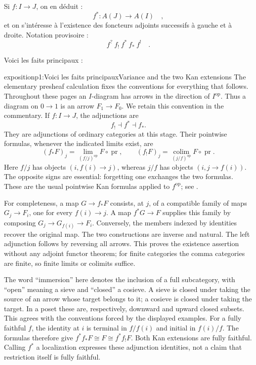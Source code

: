 Si $f : I \to J$, on en déduit :
\[
f^{*} : A(J) \to A(I) \quad ,
\]
et on s'intéresse à l'existence des foncteurs adjoints successifs à gauche et à droite. Notation provisoire :
\[
f^{?}\ f_{!}\ f^{*}\ f_{*}\ f^{!} \quad .
\]

Voici les faits principaux :

\begin{dcomment}{exposition}{p1:Voici les faits principaux}{Variance and the two Kan extensions}
The elementary presheaf calculation fixes the conventions for everything that follows. Throughout these pages an $I$-diagram has arrows in the direction of $I^{\mathrm{op}}$. Thus a diagram on $0\to1$ is an arrow $F_1\to F_0$. We retain this convention in the commentary. If $f:I\to J$, the adjunctions are
\[
 f_!\dashv f^*\dashv f_*.
\]
They are adjunctions of ordinary categories at this stage. Their pointwise formulas, whenever the indicated limits exist, are
\[
 (f_*F)_j=\lim_{(f/j)^{\mathrm{op}}}F\circ\operatorname{pr},
 \qquad
 (f_!F)_j=\operatorname*{colim}_{(j/f)^{\mathrm{op}}}F\circ\operatorname{pr}.
\]
Here $f/j$ has objects $(i,f(i)\to j)$, whereas $j/f$ has objects $(i,j\to f(i))$. The opposite signs are essential: forgetting one exchanges the two formulas. These are the usual pointwise Kan formulas applied to $f^{\mathrm{op}}$; see \citet[\S6.2]{Riehl2016}.

For completeness, a map $G\to f_*F$ consists, at $j$, of a compatible family of maps $G_j\to F_i$, one for every $f(i)\to j$. A map $f^*G\to F$ supplies this family by composing $G_j\to G_{f(i)}\to F_i$. Conversely, the members indexed by identities recover the original map. The two constructions are inverse and natural. The left adjunction follows by reversing all arrows. This proves the existence assertion without any adjoint functor theorem; for finite categories the comma categories are finite, so finite limits or colimits suffice.

The word ``immersion'' here denotes the inclusion of a full subcategory, with ``open'' meaning a sieve and ``closed'' a cosieve. A sieve is closed under taking the source of an arrow whose target belongs to it; a cosieve is closed under taking the target. In a poset these are, respectively, downward and upward closed subsets. This agrees with the conventions forced by the displayed examples. For a fully faithful $f$, the identity at $i$ is terminal in $f/f(i)$ and initial in $f(i)/f$. The formulas therefore give $f^*f_*F\cong F\cong f^*f_!F$. Both Kan extensions are fully faithful. Calling $f^*$ a localization expresses these adjunction identities, not a claim that restriction itself is fully faithful.
\end{dcomment}


